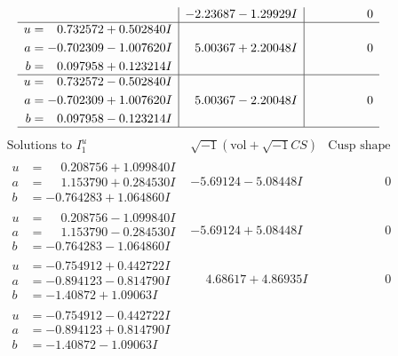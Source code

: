 \documentclass[1p]{elsarticle_modified}
\theoremstyle{definition}
\newcommand{\I}{\sqrt{-1}}
\begin{document}
$$\begin{array}{c|c|c}
 & -2.23687 - 1.29929 I & \phantom{-0.000000 } 0 \\ \hline\begin{aligned}
u &= \phantom{-}0.732572 + 0.502840 I \\
a &= -0.702309 - 1.007620 I \\
b &= \phantom{-}0.097958 + 0.123214 I\end{aligned}
 & \phantom{-}5.00367 + 2.20048 I & \phantom{-0.000000 } 0 \\ \hline\begin{aligned}
u &= \phantom{-}0.732572 - 0.502840 I \\
a &= -0.702309 + 1.007620 I \\
b &= \phantom{-}0.097958 - 0.123214 I\end{aligned}
 & \phantom{-}5.00367 - 2.20048 I & \phantom{-0.000000 } 0\\
 \hline 
 \end{array}$$\newpage$$\begin{array}{c|c|c}  
\text{Solutions to }I^u_{1}& \I (\text{vol} + \sqrt{-1}CS) & \text{Cusp shape}\\
 \hline 
\begin{aligned}
u &= \phantom{-}0.208756 + 1.099840 I \\
a &= \phantom{-}1.153790 + 0.284530 I \\
b &= -0.764283 + 1.064860 I\end{aligned}
 & -5.69124 - 5.08448 I & \phantom{-0.000000 } 0 \\ \hline\begin{aligned}
u &= \phantom{-}0.208756 - 1.099840 I \\
a &= \phantom{-}1.153790 - 0.284530 I \\
b &= -0.764283 - 1.064860 I\end{aligned}
 & -5.69124 + 5.08448 I & \phantom{-0.000000 } 0 \\ \hline\begin{aligned}
u &= -0.754912 + 0.442722 I \\
a &= -0.894123 - 0.814790 I \\
b &= -1.40872 + 1.09063 I\end{aligned}
 & \phantom{-}4.68617 + 4.86935 I & \phantom{-0.000000 } 0 \\ \hline\begin{aligned}
u &= -0.754912 - 0.442722 I \\
a &= -0.894123 + 0.814790 I \\
b &= -1.40872 - 1.09063 I\end{aligned}

\end{array}$$
\end{document}

